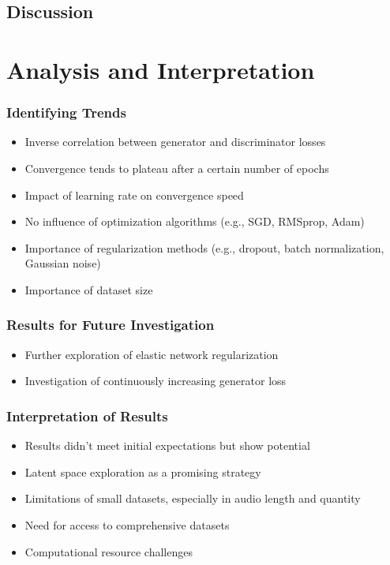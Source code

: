 \subsection{Discussion}

\section{Analysis and Interpretation} \label{sec:res-analysis}

\begin{frame}
    \frametitle{Identifying Trends}

    \begin{itemize}
        \item Inverse correlation between generator and discriminator losses
        \item Convergence tends to plateau after a certain number of epochs
        \item Impact of learning rate on convergence speed
        \item No influence of optimization algorithms (e.g., SGD, RMSprop, Adam)
        \item Importance of regularization methods (e.g., dropout, batch normalization, Gaussian noise)
        \item Importance of dataset size
    \end{itemize}

\end{frame}

\begin{frame}
    \frametitle{Results for Future Investigation}

    \begin{itemize}
        \item Further exploration of elastic network regularization
        \item Investigation of continuously increasing generator loss
    \end{itemize}

\end{frame}

\begin{frame}
    \frametitle{Interpretation of Results}

    \begin{itemize}
        \item Results didn't meet initial expectations but show potential
        \item Latent space exploration as a promising strategy
        \item Limitations of small datasets, especially in audio length and quantity
        \item Need for access to comprehensive datasets
        \item Computational resource challenges
    \end{itemize}

\end{frame}

